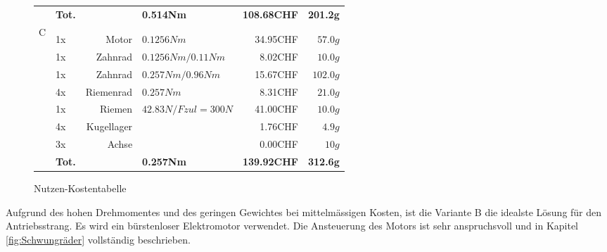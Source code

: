 \begin{figure}[h!]
\begin{tabular}{p{0.5cm}p{0.8cm}rp{3cm}rr}
          & \textbf{Tot.} &       & \textbf{0.514Nm} & \textbf{108.68CHF} & \textbf{201.2g} \\
    \multirow{9}[2]{*}{C} 
          &       &                 &                      &          &  \\
          &       &                 &                      &          &  \\
          & 1x    & Motor           & $0.1256 Nm$          & 34.95CHF & $57.0 g$ \\
          & 1x    & Zahnrad         & $0.1256 Nm / 0.11 Nm$& 8.02CHF  & $10.0 g$ \\
          & 1x    & Zahnrad         & $0.257 Nm / 0.96 Nm$ & 15.67CHF & $102.0 g$ \\
          & 4x    & Riemenrad       & $0.257 Nm$           & 8.31CHF  & $21.0 g$ \\
          & 1x    & Riemen          & $42.83 N / Fzul=300 N$ & 41.00CHF & $10.0 g$ \\
          & 4x    & Kugellager      &                      & 1.76CHF  & $4.9 g$ \\
          & 3x    & Achse           &                      & 0.00CHF  & $10 g$ \\
          & \textbf{Tot.} &       & \textbf{0.257Nm} & \textbf{139.92CHF} & \textbf{312.6g} \\
    \end{tabular}%
 	\centering
    \caption{Nutzen-Kostentabelle}
    \label{tab:addlabel}%
\end{figure}
Aufgrund des hohen Drehmomentes und des geringen Gewichtes bei mittelmässigen Kosten, ist die Variante B die idealste Lösung für den Antriebsstrang. Es wird ein bürstenloser Elektromotor verwendet. Die Ansteuerung des Motors ist sehr anspruchsvoll und in Kapitel \ref{fig:Schwungräder} vollständig beschrieben.
